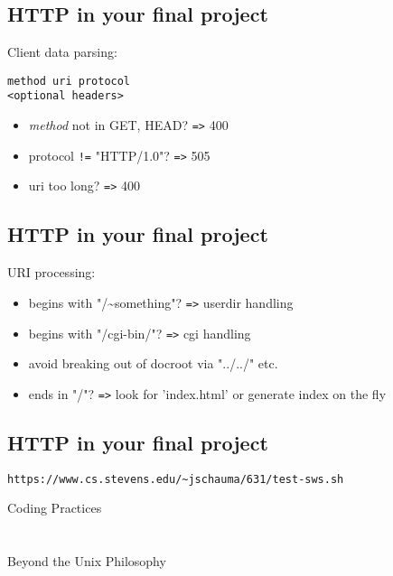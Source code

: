 \documentclass[xga]{xdvislides}
\begin{document}
\subsection{HTTP in your final project}
Client data parsing: \\
\begin{verbatim}
method uri protocol
<optional headers>

\end{verbatim}
\begin{itemize}
	\item {\em method} not in GET, HEAD? \verb+=>+ 400
	\item protocol \verb+!=+ "HTTP/1.0"? \verb+=>+ 505
	\item uri too long? \verb+=>+ 400
\end{itemize}

\subsection{HTTP in your final project}
URI processing:
\begin{itemize}
	\item begins with "/\~{}something"? \verb+=>+ userdir handling
	\item begins with "/cgi-bin/"? \verb+=>+ cgi handling
	\item avoid breaking out of docroot via "../../" etc.
	\item ends in "/"? \verb+=>+ look for 'index.html' or generate index on the fly
\end{itemize}

\subsection{HTTP in your final project}
\verb+https://www.cs.stevens.edu/~jschauma/631/test-sws.sh+

\newpage
\vspace*{\fill}
\begin{center}
	\Hugesize
		Coding Practices\\ [1em]
	\hspace*{5mm}
	\blueline\\
	\hspace*{5mm}\\
		Beyond the Unix Philosophy
\end{center}
\vspace*{\fill}
\end{document}
